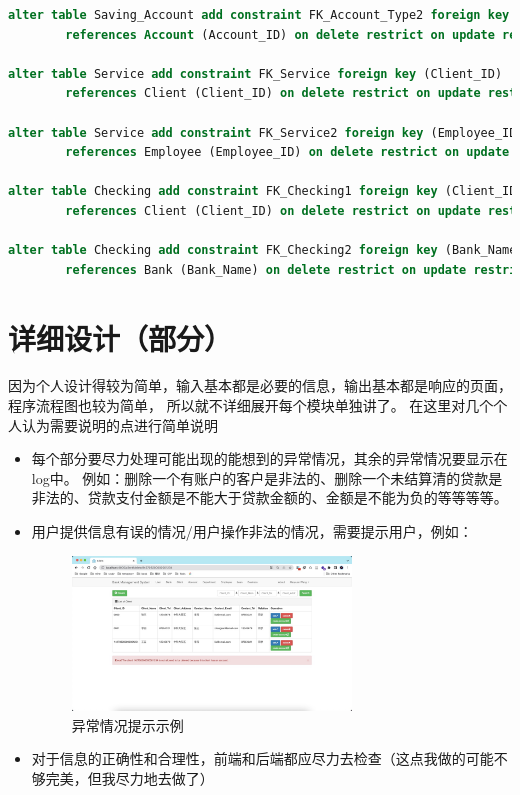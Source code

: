 \documentclass{article}
\begin{document}
\begin{lstlisting}[language=sql]
alter table Saving_Account add constraint FK_Account_Type2 foreign key (Account_ID)
        references Account (Account_ID) on delete restrict on update restrict;

alter table Service add constraint FK_Service foreign key (Client_ID)
        references Client (Client_ID) on delete restrict on update restrict;

alter table Service add constraint FK_Service2 foreign key (Employee_ID)
        references Employee (Employee_ID) on delete restrict on update restrict;

alter table Checking add constraint FK_Checking1 foreign key (Client_ID)
        references Client (Client_ID) on delete restrict on update restrict;

alter table Checking add constraint FK_Checking2 foreign key (Bank_Name)
        references Bank (Bank_Name) on delete restrict on update restrict;
    \end{lstlisting}
    \section{详细设计（部分）}
    因为个人设计得较为简单，输入基本都是必要的信息，输出基本都是响应的页面，程序流程图也较为简单，
    所以就不详细展开每个模块单独讲了。
    在这里对几个个人认为需要说明的点进行简单说明
    \begin{itemize}
        \item 每个部分要尽力处理可能出现的能想到的异常情况，其余的异常情况要显示在log中。
        例如：删除一个有账户的客户是非法的、删除一个未结算清的贷款是非法的、贷款支付金额是不能大于贷款金额的、金额是不能为负的等等等等。
        \item 用户提供信息有误的情况/用户操作非法的情况，需要提示用户，例如：
        \begin{figure}[H]
            \centering
            \includegraphics[width=0.7\textwidth]{./fig/delete_account_error.jpg}
            \caption{异常情况提示示例}
        \end{figure}
        \item 对于信息的正确性和合理性，前端和后端都应尽力去检查（这点我做的可能不够完美，但我尽力地去做了）
    \end{itemize}
\end{document}
